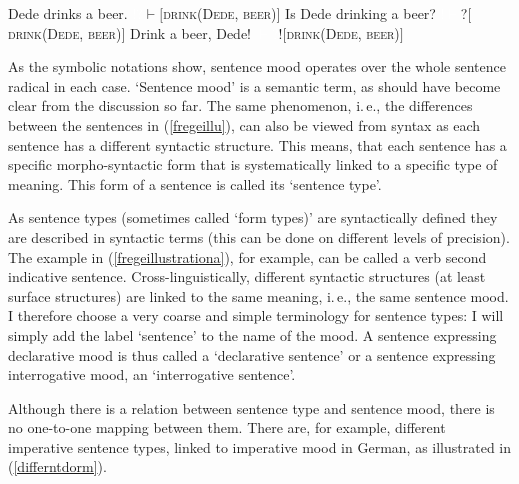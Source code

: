 \begin{exe}
\ex\label{fregeillu}\begin{xlist} 
\ex Dede drinks a beer. \hfill {\textcolor{white}{!?}$\vdash$$[$\textsc{drink}(\textsc{Dede}, \textsc{beer})$]$} \label{fregeillustrationa}
\ex Is Dede drinking a beer? \hfill {\textcolor{white}{!$\vdash$}?$[$\textsc{drink}(\textsc{Dede}, \textsc{beer})$]$} \label{fregeillustrationb}
\ex Drink a beer, Dede! \hfill {\textcolor{white}{$\vdash$?}!$[$\textsc{drink}(\textsc{Dede}, \textsc{beer})$]$} \label{fregeillustrationc}
\end{xlist}
\end{exe} 

\noindent As the symbolic notations show, sentence mood operates over the whole sentence radical in each case. `Sentence mood' is a semantic term, as should have become clear from the discussion so far. The same phenomenon, i.\,e., the differences between the sentences in (\ref{fregeillu}), can also be viewed from syntax as each sentence has a different syntactic structure. This means, that each sentence has a specific morpho-syntactic form that is systematically linked to a specific type of meaning. This form of a sentence is called its `sentence type'. 

As sentence types (sometimes called `form types)' are syntactically defined they are described in syntactic terms (this can be done on different levels of precision). The example in (\ref{fregeillustrationa}), for example, can be called a verb second indicative sentence. Cross-linguistically, different syntactic structures (at least surface structures) are linked to the same meaning, i.\,e., the same sentence mood. I therefore choose a very coarse and simple terminology for sentence types: I will simply add the label `sentence' to the name of the mood. A sentence expressing declarative mood is thus called a `declarative sentence' or a sentence expressing interrogative mood, an `interrogative sentence'.

Although there is a relation between sentence type and sentence mood, there is no one-to-one mapping between them. There are, for example, different imperative sentence types, linked to imperative mood in German, as illustrated in (\ref{differntdorm}).


